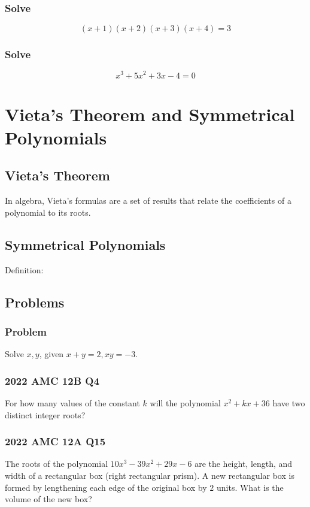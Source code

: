 \documentclass{article}
\begin{document}
\subsubsection{Solve}
$$(x+1)(x+2)(x+3)(x+4)=3$$
\vspace{40px}

\subsubsection{Solve}
$$x^3 + 5 x^2 + 3 x - 4 = 0$$
\vspace{40px}

\section{Vieta's Theorem and Symmetrical Polynomials}
\subsection{Vieta's Theorem}
In algebra, Vieta's formulas are a set of results that relate the coefficients of a polynomial to its roots. 

\pagebreak

\subsection{Symmetrical Polynomials}
Definition:
\vspace{30px}
\subsection{Problems}
\subsubsection{Problem}
Solve $x, y$, given $x+y=2, xy=-3$.
\vspace{60px}
\subsubsection{2022 AMC 12B Q4}
For how many values of the constant $k$ will the polynomial $x^{2}+kx+36$ have two distinct integer roots?
\vspace{60px}
\subsubsection{2022 AMC 12A Q15}
The roots of the polynomial $10x^3-39x^2+29x-6$ are the height, length, and width of a rectangular box (right rectangular prism). A new rectangular box is formed by lengthening each edge of the original box by $2$ units. What is the volume of the new box?
\pagebreak
\end{document}
